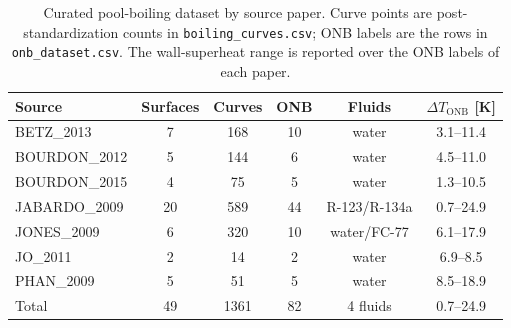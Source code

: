 \begin{table}[!htbp]
\centering
\caption{Curated pool-boiling dataset by source paper. Curve points are
post-standardization counts in \texttt{boiling\_curves.csv}; ONB labels
are the rows in \texttt{onb\_dataset.csv}. The wall-superheat range is
reported over the ONB labels of each paper.}
\label{tab:dataset}
\footnotesize
\begin{tabular}{lccccc}
\hline
Source & Surfaces & Curves & ONB & Fluids & $\Delta T_{\mathrm{ONB}}$ [K] \\
\hline
BETZ\_2013      &  7 & 168 & 10 & water                  & 3.1--11.4 \\
BOURDON\_2012   &  5 & 144 &  6 & water                  & 4.5--11.0 \\
BOURDON\_2015   &  4 &  75 &  5 & water                  & 1.3--10.5 \\
JABARDO\_2009   & 20 & 589 & 44 & R-123/R-134a           & 0.7--24.9 \\
JONES\_2009     &  6 & 320 & 10 & water/FC-77            & 6.1--17.9 \\
JO\_2011        &  2 &  14 &  2 & water                  & 6.9--8.5  \\
PHAN\_2009      &  5 &  51 &  5 & water                  & 8.5--18.9 \\
\hline
Total           & 49 & \num{1361} & 82 & 4 fluids              & 0.7--24.9 \\
\hline
\end{tabular}
\end{table}
